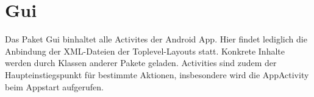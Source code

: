 \label{module:gui}\section{Gui}
Das Paket Gui binhaltet alle Activites der Android App. Hier findet lediglich die Anbindung der XML-Dateien der Toplevel-Layouts statt. Konkrete Inhalte werden durch Klassen anderer Pakete geladen. Activities sind zudem der Haupteinstiegspunkt für bestimmte Aktionen, insbesondere wird die AppActivity beim Appstart aufgerufen.